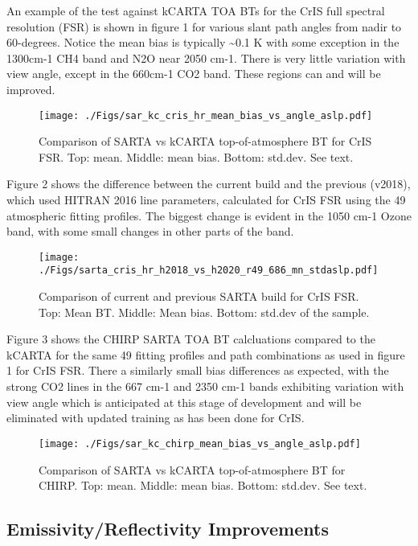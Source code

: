 \documentclass[11pt,twocolumn]{article}
\begin{document}
An example of the test against kCARTA TOA BTs for the CrIS full spectral resolution (FSR)
is shown in figure 1 for various slant path angles from nadir to 60-degrees. Notice the
mean bias is typically \textasciitilde{}0.1 K with some exception in the 1300cm-1 CH4 band and N2O near 2050 cm-1.
There is very little variation with view angle, except in the 660cm-1 CO2 band. These regions
can and will be improved.

\begin{figure}[htbp]
\centering
\texttt{[image: ./Figs/sar\_kc\_cris\_hr\_mean\_bias\_vs\_angle\_aslp.pdf]}
\caption{\label{fig:org9a5a26c}Comparison of SARTA vs kCARTA top-of-atmosphere BT for CrIS FSR. Top: mean. Middle: mean bias. Bottom: std.dev. See text.}
\end{figure}

Figure 2 shows the difference between the current build and the previous (v2018),
which used HITRAN 2016
line parameters, calculated for CrIS FSR using the 49 atmospheric fitting profiles. The
biggest change is evident in the 1050 cm-1 Ozone band, with some small changes in other parts
of the band.

\begin{figure}[htbp]
\centering
\texttt{[image: ./Figs/sarta\_cris\_hr\_h2018\_vs\_h2020\_r49\_686\_mn\_stdaslp.pdf]}
\caption{\label{fig:org538e2b1}Comparison of current and previous SARTA build for CrIS FSR. Top: Mean BT. Middle: Mean bias. Bottom: std.dev of the sample.}
\end{figure}

Figure 3 shows the CHIRP SARTA TOA BT calcluations compared to the kCARTA for the same 49 fitting
profiles and path combinations as used in figure 1 for CrIS FSR. There a similarly small bias
differences as expected, with the strong CO2 lines in the 667 cm-1 and 2350 cm-1 bands
exhibiting variation with view angle which is anticipated at this stage of
development and will be eliminated with updated training as has been done for CrIS.

\begin{figure}[htbp]
\centering
\texttt{[image: ./Figs/sar\_kc\_chirp\_mean\_bias\_vs\_angle\_aslp.pdf]}
\caption{\label{fig:orgc90c8a1}Comparison of SARTA vs kCARTA top-of-atmosphere BT for CHIRP. Top: mean. Middle: mean bias. Bottom: std.dev. See text.}
\end{figure}


\subsection{Emissivity/Reflectivity Improvements}
\label{sec:orgb7d7229}
\end{document}
